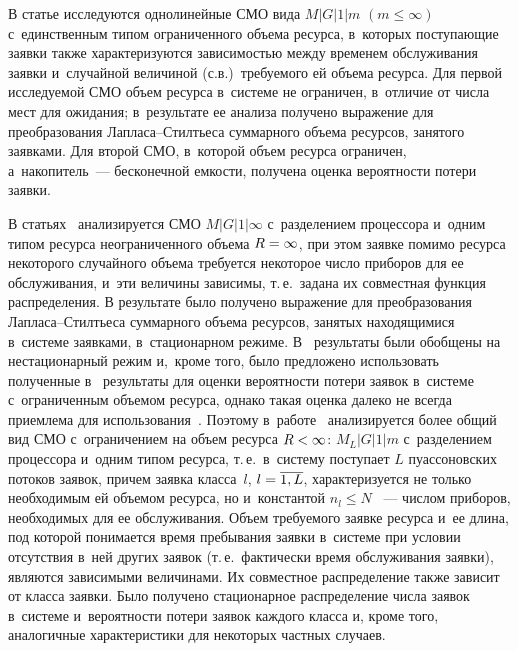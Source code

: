 \begin{multicols}{2}
В статье \cite{Tihonenko_24_1990} исследуются однолинейные СМО вида $M|G|1|m$ 
$(m\leq\infty)$ с~единственным типом ограниченного объема ресурса, 
в~которых поступающие заявки также характеризуются зависимостью между временем 
обслуживания заявки и~случайной величиной (с.в.)\ требуемого ей объема ресурса. 
Для первой исследуемой СМО объем ресурса в~сис\-те\-ме не ограничен, в~отличие от 
числа мест для ожидания; в~результате ее анализа получено выражение для 
преобразования Лап\-ла\-са--Стилть\-еса суммарного объема ресурсов, занятого заявками. 
Для второй СМО, в~которой объем ресурса ограничен, а~накопитель~--- бесконечной 
емкости, получена оценка вероятности потери заявки.

В статьях~\cite{Sengupta,Tihonenko_40_2002} анализируется СМО $M|G|1|\infty$ 
с~разделением процессора и~одним типом ресурса неограниченного объема $R\hm=\infty$, 
при этом заявке помимо ресурса некоторого случайного объема требуется некоторое 
число приборов для ее обслуживания, и~эти величины зависимы, т.\,е.\ задана их 
совместная функция распределения. В результате было получено выражение для 
преобразования Лап\-ла\-са--Стилть\-еса суммарного объема ресурсов, занятых 
находящимися в~сис\-те\-ме заявками, в~стационарном режиме.
В~\cite{Tihonenko_40_2002} результаты были обобщены на нестационарный режим 
и,~кроме того, было предложено использовать полученные в~\cite{Sengupta} результаты 
для оценки вероятности потери заявок в~сис\-те\-ме с~ограниченным объемом ресурса, 
однако такая оценка далеко не всегда приемлема для использования~\cite{Tihonenko_40_2002}.
Поэтому в~работе~\cite{Tihonenko_25_2010} анализируется более общий вид СМО 
с~ограничением на объем ресурса $R\hm<\infty$: $M_{L}|G|1|m$ с~разделением процессора и~одним типом ресурса, т.\,е.\ 
в~сис\-те\-му поступает $L$ пуассоновских потоков 
заявок, причем заявка класса~$l$, $l\hm=\overline{1,L}$, характеризуется не только 
необходимым ей объемом ресурса, но и~константой $n_l\leq N$ ~--- числом 
приборов, необходимых для ее обслуживания.
Объем требуемого заявке ресурса и~ее длина, под которой понимается время 
пребывания заявки в~сис\-те\-ме при условии отсутствия в~ней других заявок (т.\,е.\ 
фактически время обслуживания заявки), являются зависимыми величинами. Их 
совместное распределение также зависит от класса заявки. Было получено 
стационарное распределение числа заявок в~сис\-те\-ме и~вероятности потери заявок 
каждого класса и, кроме того,  аналогичные характеристики для некоторых частных 
случаев.
{\looseness=1

}


\end{multicols}
